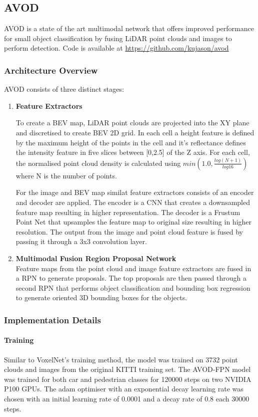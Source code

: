 \subsection{AVOD}
AVOD is a state of the art multimodal network that offers improved performance for small object classification by fusing LiDAR point clouds and images to perform detection. 
Code is available at \url{https://github.com/kujason/avod}
\subsubsection{Architecture Overview}
AVOD consists of three distinct stages: 
\begin{enumerate}
	
	\item \textbf{Feature Extractors } 
	
	To create a BEV map, LiDAR point clouds are projected into the XY plane and discretised to create BEV 2D grid. In each cell a height feature is defined by the maximum height of the points in the cell and it's reflectance defines the intensity feature in five slices between [0,2.5] of the Z axis. For each cell, the normalised point cloud density is calculated using $min(1.0, \frac{log(N +1)}{log 16} )$ where N is the number of points. 
	
	For the image and BEV map similat feature extractors consists of an encoder and decoder are applied. The encoder is a CNN that creates a downsampled feature map resulting in higher representation. The decoder is a Frustum Point Net that upsamples the  feature map to original size resulting in higher resolution. The output from the image and point cloud feature is fused by passing it through a 3x3 convolution layer. 
	\item \textbf{Multimodal Fusion Region Proposal Network} \\ 
	Feature maps from the point cloud and image feature extractors are fused in a RPN to generate proposals. The top proposals are then passed through a second RPN that performs object classification and bounding box regression to generate  oriented 3D bounding boxes for the objects.
\end{enumerate}

\subsubsection*{Implementation Details}

\paragraph{Training} 
Similar to VoxelNet's training method, the model was trained on 3732 point clouds  and images from the original KITTI training set. The AVOD-FPN model was trained for both car and pedestrian classes for 120000 steps on two NVIDIA P100 GPUs. The adam optimiser with an exponential decay learning rate was chosen with an initial learning rate of 0.0001 and a decay rate of 0.8 each 30000 steps. 

